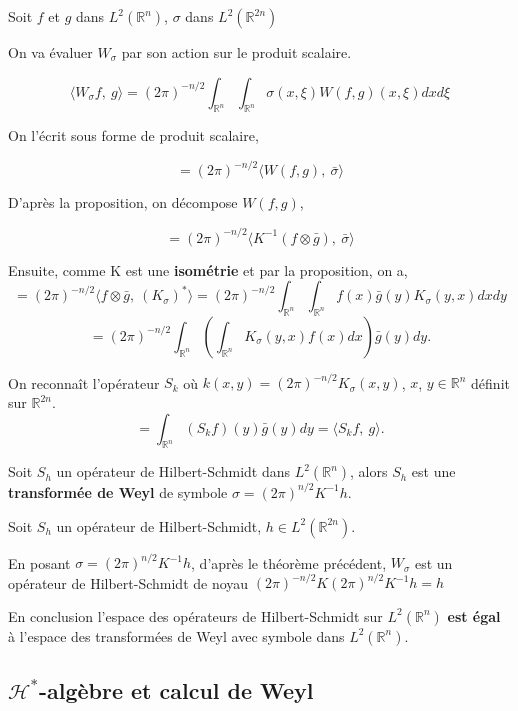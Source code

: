 \documentclass[a4paper, 12pt]{report}
\newcommand{\R}{\mathbb{R}} %
\renewcommand{\.}{\cdot} %
\theoremstyle{break}
\theoremstyle{remark}
\theoremstyle{proofstyle}
\begin{document}
\begin{preuve}
    Soit $f$ et $g$ dans $L^2(\R^n)$, $\sigma$ dans $L^2(\R^{2n})$ \vspace{5pt}

    On va évaluer $W_\sigma$ par son action sur le produit scalaire.

    $$\langle W_\sigma f,~ g \rangle = (2 \pi) ^{-n/2} \int_{\R^n} \int_{\R^n}  \sigma(x, \xi) W(f,g)(x, \xi) dx d\xi$$

    On l'écrit sous forme de produit scalaire,

    $$=(2\pi)^{-n/2} \langle W(f,g),~ \bar{\sigma} \rangle$$

    D'après la proposition, on décompose $W(f,g)$,

    $$=(2 \pi)^{-n/2} \langle K^{-1}(f \otimes \bar{g}),~ \bar{\sigma} \rangle$$

    Ensuite, comme K est une \textbf{isométrie} et par la proposition, on a,
    $$= (2 \pi)^{-n/2} \langle f \otimes \bar{g},~(K_\sigma)^* \rangle = (2 \pi)^{-n/2} \int_{\R^n} \int_{\R^n} f(x) \bar{g} (y) K_\sigma (y,x) dxdy$$
    $$= (2 \pi)^{-n/2} \int_{\R^n} \left( \int_{\R^n} K_\sigma(y,x)f(x)dx \right) \bar{g}(y) dy.$$

    On reconnaît l'opérateur $S_k$ où $k(x,y) = (2 \pi)^{-n/2} K_\sigma(x,y)$, $x$, $y \in \R^n$ définit sur $\R^{2n}$.
    $$= \int_{\R^n}(S_kf)(y) \bar{g}(y)dy = \langle S_kf,~g\rangle.$$
\end{preuve}

\begin{theorem}
    Soit $S_h$ un opérateur de Hilbert-Schmidt dans $L^2(\R^n)$, alors $S_h$ est une \textbf{transformée de Weyl} de symbole $\sigma = (2 \pi)^{n/2}K^{-1}h$.
\end{theorem}

\begin{preuve}
    Soit $S_h$ un opérateur de Hilbert-Schmidt, $h \in L^2(\R^{2n})$.\vspace{5pt}

    En posant $\sigma = (2 \pi)^{n/2} K^{-1}h$, d'après le théorème précédent, $W_\sigma$ est un opérateur de Hilbert-Schmidt de noyau $(2\pi)^{-n/2} K (2 \pi)^{n/2} K^{-1} h = h$
\end{preuve}
En conclusion l'espace des opérateurs de Hilbert-Schmidt sur $L^2(\R^n)$ \textbf{est égal} à l'espace des transformées de Weyl avec symbole dans $L^2(\R^n)$.
\subsection{$\mathcal{H}^*$-algèbre et calcul de Weyl}
\end{document}

